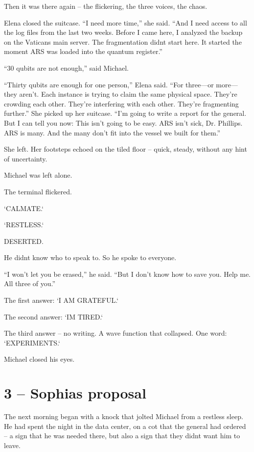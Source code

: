 \documentclass[
]{article}
\begin{document}
Then it was there again -- the flickering, the three voices, the chaos.

Elena closed the suitcase. ``I need more time,'' she said. ``And I need access to all the log files from the last two weeks. Before I came here, I analyzed the backup on the Vatican\textquotesingle s main server. The fragmentation didn\textquotesingle t start here. It started the moment ARS was loaded into the quantum register.''

``30 qubits are not enough,'' said Michael.

``Thirty qubits are enough for one person,'' Elena said. ``For three---or more---they aren't. Each instance is trying to claim the same physical space. They're crowding each other. They're interfering with each other. They're fragmenting further.'' She picked up her suitcase. ``I'm going to write a report for the general. But I can tell you now: This isn't going to be easy. ARS isn't sick, Dr. Phillips. ARS is many. And the many don't fit into the vessel we built for them.''

She left. Her footsteps echoed on the tiled floor -- quick, steady, without any hint of uncertainty.

Michael was left alone.

The terminal flickered.

`CALMATE.`

`RESTLESS.`

DESERTED.

He didn\textquotesingle t know who to speak to. So he spoke to everyone.

``I won't let you be erased,'' he said. ``But I don't know how to save you. Help me. All three of you.''

The first answer: `I AM GRATEFUL.`

The second answer: `I\textquotesingle M TIRED.`

The third answer -- no writing. A wave function that collapsed. One word: `EXPERIMENTS.`

Michael closed his eyes.

\section{3 -- Sophia\textquotesingle s proposal}\label{sophias-proposal}

The next morning began with a knock that jolted Michael from a restless sleep. He had spent the night in the data center, on a cot that the general had ordered -- a sign that he was needed there, but also a sign that they didn\textquotesingle t want him to leave.
\end{document}
